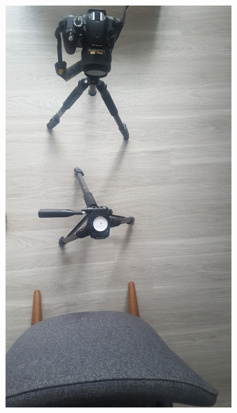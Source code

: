 \documentclass[letterpaper,12pt]{article}
\begin{document}
\begin{figure}[h]
\begin{subfigure}[b]{0.3\textwidth}
        \includegraphics[width=0.95\textwidth]{Study_BGDist_Mid.JPG}
        \caption{}
        \label{fig:Study_BGDist_Mid}
    \end{subfigure}
    \begin{subfigure}[b]{0.3\textwidth}
    	\centering

\end{subfigure}
\end{figure}
\end{document}
